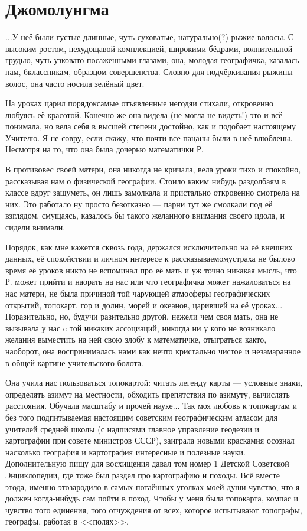 \newpage
\section*{Джомолунгма}

$\ldots$У неё были густые длинные, чуть суховатые, натурально(?) рыжие волосы. С высоким ростом, нехудощавой комплекцией, широкими бёдрами, волнительной грудью, чуть узковато посаженными глазами, она, молодая географичка, казалась нам, 6\sdash классникам, образцом совершенства. Словно для подчёркивания рыжины волос, она часто носила зелёный цвет. 

На уроках царил порядок\mdash самые отъявленные негодяи стихали, откровенно любуясь её красотой. Конечно же она видела (не могла не видеть!) это и всё понимала, но вела себя в высшей степени достойно, как и подобает настоящему Учителю. Я не совру, если скажу, что почти все пацаны были в неё влюблены. Несмотря на то, что она была дочерью математички Р.

В противовес своей матери, она никогда не кричала, вела уроки тихо и спокойно, рассказывая нам о физической географии. Стоило каким нибудь раздолбаям в классе вдруг зашуметь, он лишь замолкала и пристально откровенно смотрела на них. Это работало ну просто безотказно — парни тут же смолкали под её взглядом, смущаясь, казалось бы такого желанного внимания своего идола, и сидели внимали. 

Порядок, как мне кажется сквозь года, держался исключительно на её внешних данных, её спокойствии и личном интересе к рассказываемому\mdash страха не было\mdash во время её уроков никто не вспоминал про её мать и уж точно никакая мысль, что Р. может прийти и наорать на нас или что географичка может нажаловаться на нас матери, не была причиной той чарующей атмосферы географических открытий, топокарт, гор и долин, морей и океанов, царившей на её уроках$\ldots$ Поразительно, но, будучи разительно другой, нежели чем своя мать, она не вызывала у нас c той никаких ассоциаций, никогда ни у кого не возникало желания выместить на ней свою злобу к математичке, отыграться как\sdash то, наоборот, она воспринималась нами как нечто кристально чистое и незамаранное в общей картине учительского болота.
 
Она учила нас пользоваться топокартой: читать легенду карты — условные знаки, определять азимут на местности, обходить препятствия по азимуту, вычислять расстояния. Обучала масштабу и прочей науке$\ldots$ Так моя любовь к топокартам и без того подпитываемая настоящим советским географическим атласом для учителей средней школы (с надписями главное управление геодезии и картографии при совете министров СССР), заиграла новыми красками\mdash я осознал насколько география и картография интересные и полезные науки. Дополнительную пищу для восхищения давал том номер 1 Детской Советской Энциклопедии, где тоже был раздел про картографию и походы. Всё вместе это\mdash да, именно это\mdash зародило в самых потаённых уголках моей души чувство, что я должен когда-нибудь сам пойти в поход. Чтобы у меня была топокарта, компас и чувство того единения, того отчуждения от всех, которое испытывают топографы, географы, работая в <<полях>>.
 
